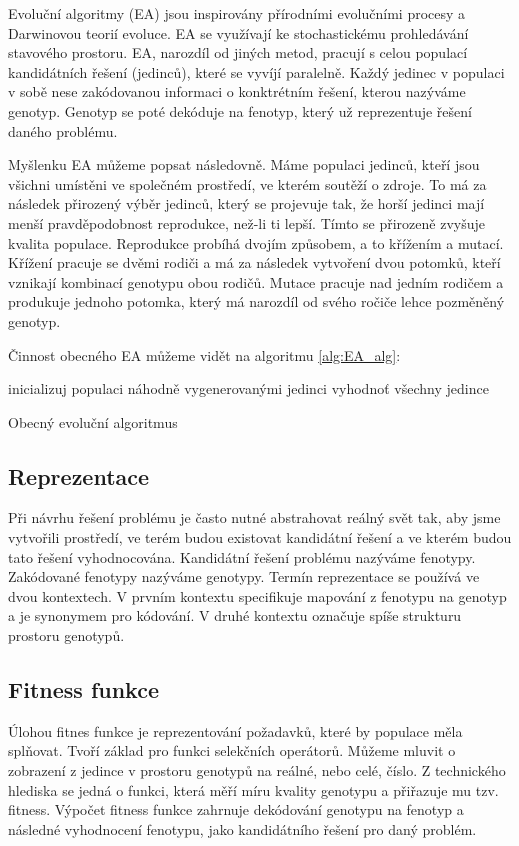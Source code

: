 Evoluční algoritmy (EA) jsou inspirovány přírodními evolučními procesy a Darwinovou teorií evoluce.
EA se využívají ke stochastickému prohledávání stavového prostoru.
EA, narozdíl od jiných metod, pracují s celou populací kandidátních řešení (jedinců), které se vyvíjí paralelně.
Každý jedinec v populaci v sobě nese zakódovanou informaci o konktrétním řešení, kterou nazýváme genotyp.
Genotyp se poté dekóduje na fenotyp, který už reprezentuje řešení daného problému.

Myšlenku EA můžeme popsat následovně.
Máme populaci jedinců, kteří jsou všichni umístěni ve společném prostředí, ve kterém soutěží o zdroje.
To má za následek přirozený výběr jedinců, který se projevuje tak, že horší jedinci mají menší pravděpodobnost reprodukce, než-li ti lepší.
Tímto se přirozeně zvyšuje kvalita populace.
Reprodukce probíhá dvojím způsobem, a to křížením a mutací.
Křížení pracuje se dvěmi rodiči a má za následek vytvoření dvou potomků, kteří vznikají kombinací genotypu obou rodičů.
Mutace pracuje nad jedním rodičem a produkuje jednoho potomka, který má narozdíl od svého ročiče lehce pozměněný genotyp.

Činnost obecného EA můžeme vidět na algoritmu \ref{alg:EA_alg}:


\begin{algorithm}[H]
    inicializuj populaci náhodně vygenerovanými jedinci\;
    vyhodnoť všechny jedince\;
    \caption{Obecný evoluční algoritmus}
    \label{alg:EA_alg}
\end{algorithm}

\subsection{Reprezentace}
Při návrhu řešení problému je často nutné abstrahovat reálný svět tak, aby jsme vytvořili prostředí, ve terém budou existovat kandidátní řešení a ve kterém budou tato řešení vyhodnocována.
Kandidátní řešení problému nazýváme fenotypy.
Zakódované fenotypy nazýváme genotypy.
Termín reprezentace se používá ve dvou kontextech.
V prvním kontextu specifikuje mapování z fenotypu na genotyp a je synonymem pro kódování.
V druhé kontextu označuje spíše strukturu prostoru genotypů.

\subsection{Fitness funkce}
Úlohou fitnes funkce je reprezentování požadavků, které by populace měla splňovat.
Tvoří základ pro funkci selekčních operátorů.
Můžeme mluvit o zobrazení z jedince v prostoru genotypů na reálné, nebo celé, číslo.
Z technického hlediska se jedná o funkci, která měří míru kvality genotypu a přiřazuje mu tzv. fitness.
Výpočet fitness funkce zahrnuje dekódování genotypu na fenotyp a následné vyhodnocení fenotypu, jako kandidátního řešení pro daný problém.

